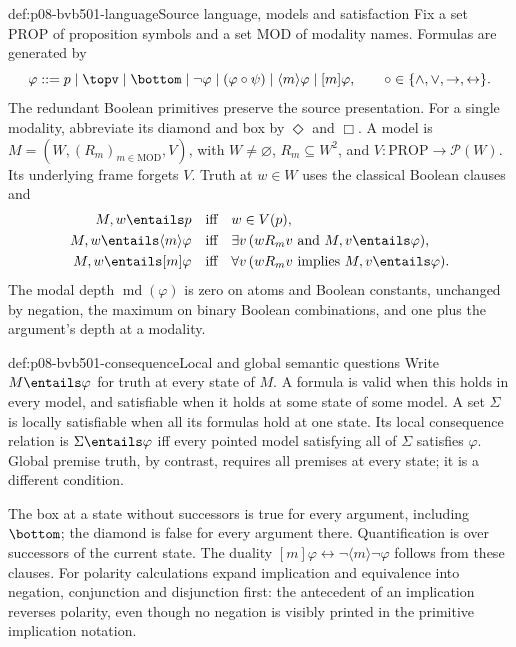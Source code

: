 \begin{hbdefinition}{def:p08-bvb501-language}{Source language, models and satisfaction}
Fix a set \(\mathrm{PROP}\) of proposition symbols and a set
\(\mathrm{MOD}\) of modality names. Formulas are generated by
\[
 \varphi ::= p\mid\topv\mid\bottom\mid\neg\varphi
 \mid(\varphi\circ\psi)\mid\langle m\rangle\varphi
 \mid[m]\varphi,
 \qquad\circ\in\{\land,\lor,\to,\leftrightarrow\}.
\]
The redundant Boolean primitives preserve the source presentation. For a
single modality, abbreviate its diamond and box by \(\Diamond\) and \(\Box\).
A model is \(M=(W,(R_m)_{m\in\mathrm{MOD}},V)\), with
\(W\ne\varnothing\), \(R_m\subseteq W^2\), and
\(V:\mathrm{PROP}\to\mathcal P(W)\). Its underlying frame forgets
\(V\). Truth at \(w\in W\) uses the classical Boolean clauses and
\[
 \begin{aligned}
 M,w\entails p&\quad\text{iff}\quad w\in V(p),\\
 M,w\entails\langle m\rangle\varphi
  &\quad\text{iff}\quad\exists v\,(wR_mv\ \text{and}\ M,v\entails\varphi),\\
 M,w\entails[m]\varphi
  &\quad\text{iff}\quad\forall v\,(wR_mv\ \text{implies}\ M,v\entails\varphi).
 \end{aligned}
\]
The modal depth \(\operatorname{md}(\varphi)\) is zero on atoms and
Boolean constants, unchanged by negation, the maximum on binary Boolean
combinations, and one plus the argument's depth at a modality.
\end{hbdefinition}

\begin{hbdefinition}{def:p08-bvb501-consequence}{Local and global semantic questions}
Write \(M\entails\varphi\) for truth at every state of \(M\).
A formula is valid when this holds in every model, and satisfiable when it
holds at some state of some model. A set \(\Sigma\) is locally satisfiable
when all its formulas hold at one state. Its local consequence relation is
\(\Sigma\entails\varphi\) iff every pointed model satisfying all of
\(\Sigma\) satisfies \(\varphi\). Global premise truth, by contrast,
requires all premises at every state; it is a different condition.
\end{hbdefinition}

The box at a state without successors is true for every argument, including
\(\bottom\); the diamond is false for every argument there. Quantification
is over successors of the current state. The duality
\([m]\varphi\leftrightarrow\neg\langle m\rangle\neg\varphi\)
follows from these clauses. For polarity calculations expand implication
and equivalence into negation, conjunction and disjunction first: the
antecedent of an implication reverses polarity, even though no negation
is visibly printed in the primitive implication notation.

